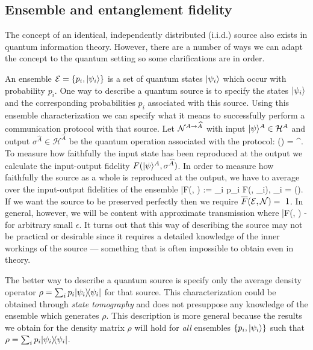 \documentclass[aps,11pt,twoside,letterpaper]{article}
\def\E{\mathcal{E}}
\def\cH{\mathcal{H}}
\theoremstyle{plain}
\theoremstyle{definition}
\begin{document}
						
			
			
			
		\bigskip				
		\subsection{Ensemble and entanglement fidelity}	\label{subsection:ent-fid}
		
			The concept of an identical, independently distributed (i.i.d.) source also exists in quantum information
			theory. However, there are a number of ways we can adapt the concept to the quantum setting so some
			clarifications are in order.
			
			An ensemble $\E=\{p_i, \ket{\psi_i} \}$ is a set of quantum states $| \psi_i \rangle$ which occur with 
			probability $p_i$. 
			One way to describe a quantum source is to specify the states $| \psi_i \rangle$ and the
			corresponding probabilities $p_i$ associated with this source. 
			Using this ensemble characterization we can specify what it means to successfully 
			perform a communication protocol with that source.
			Let ${\cal N}^{A \to \widehat{A}}$ with input $\ket{\psi}^A \in \cH^A$ and output 
			$\sigma^{\widehat{A}} \in \cH^{\widehat{A}}$ be the quantum operation associated with the protocol:
			\be
				\cN(\proj{\psi}) = \sigma^{}.
			\ee
			To measure how faithfully the input state has been reproduced at the output we calculate the 
			input-output fidelity $F(| \psi \rangle^A, \sigma^{\widehat{A}})$. 
			In order to measure how faithfully the source as a whole is reproduced at the output, 
			we have to average over the input-output fidelities of the ensemble
			\be
				\bar{F}\!\left(\E, \cN\right) :=	\sum_i	p_i F(, \sigma_i), 
				\qquad \sigma_i = \cN().
			\ee
			If we want the source to be preserved perfectly then we require $\bar{F}(\E, \cN)=~1$.
			In general, however, we will be content with approximate transmission where
			\be \label{eqn:MixedFidDef}
				\bar{F}\!\left(\E, \cN\right)  - \epsilon
			\ee
			for arbitrary small $\epsilon$.
			It turns out that this way of describing the source may not be practical or desirable since 
			it requires a detailed knowledge of the inner workings of the source --- something that is 
			often impossible to obtain even in theory.
			
			The better way to describe a quantum source is specify only the average density operator 
			$\rho = \sum_i p_i | \psi_i \rangle\!\langle \psi_i |$ for that source. 
			This characterization could be obtained through \emph{state tomography} \cite{NC04} and 
			does not presuppose any knowledge of the ensemble which generates $\rho$.
			This description is more general because the results we obtain for the density matrix $\rho$ will hold
			for \emph{all} ensembles $\{p_i, | \psi_i \rangle \}$ such that $\rho = \sum_i p_i | \psi_i \rangle\!\langle \psi_i |$.
			
\end{document}
